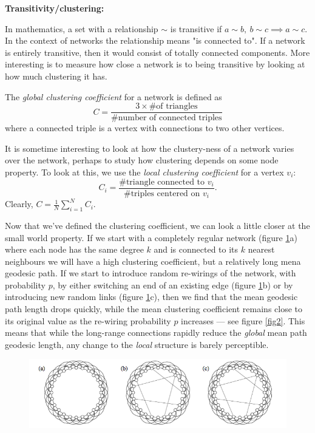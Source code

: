 {\bf Transitivity/clustering:}

In mathematics, a set with a relationship $\sim$ is transitive if $a \sim b,~b\sim c \implies a \sim c$. In the context of networks the relationship means "is connected to". If a network is entirely transitive, then it would consist of totally connected components. More interesting is to measure how close a network is to being transitive by looking at how much clustering it has.

The \emph{global clustering coefficient} for a network is defined as
$$
	C=\frac{3\times\text{\# of triangles}}{\text{\# number of connected triples}}
$$
where a connected triple is a vertex with connections to two other vertices.

It is sometime interesting to look at how the clustery-ness of a network varies over the network, perhaps to study how clustering depends on some node property. To look at this, we use the \emph{local clustering coefficient} for a vertex $v_i$:
$$
	C_i = \frac{\text{\# triangle connected to }v_i}{\text{\# triples centered on }v_i}.
$$
Clearly, $C = \frac{1}{N}\sum_{i=1}^NC_i$.

Now that we've defined the clustering coefficient, we can look a little closer at the small world property.
If we start with a completely regular network (figure \ref{fig1}a) where each node has the same degree $k$ and is connected to its $k$ nearest neighbours we will have a high clustering coefficient, but a relatively long mena geodesic path. If we start to introduce random re-wirings of the network, with probability $p$, by either switching an end of an existing edge (figure \ref{fig1}b) or by introducing new random links (figure \ref{fig1}c), then we find that the mean geodesic path length drops quickly, while the mean clustering coefficient remains close to its original value as the re-wiring probability $p$ increases --- see figure \ref{fig2}. This means that while the long-range connections rapidly reduce the \emph{global} mean path geodesic length, any change to the \emph{local} structure is barely perceptible.

\begin{figure}
	\begin{center}
		\includegraphics[width = 12cm]{regularNW.png}
	\end{center}
	\caption{}
	\label{fig1}
\end{figure}

